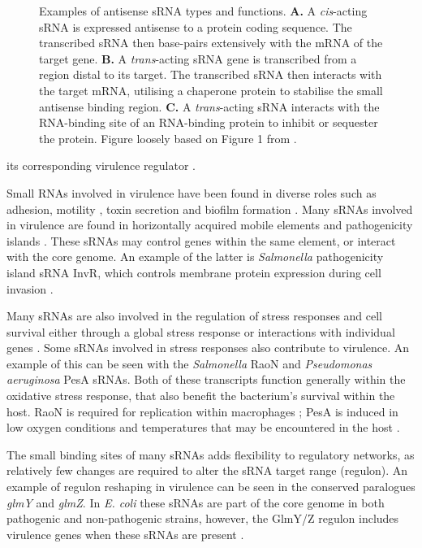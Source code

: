 \begin{figure}
  \centering
  \caption[Examples of antisense sRNA types and functions]{Examples of antisense sRNA types and functions. \textbf{A.} A \textit{cis}-acting sRNA is expressed antisense to a protein coding sequence. The transcribed sRNA then base-pairs extensively with the mRNA of the target gene. \textbf{B.} A \textit{trans}-acting sRNA gene is transcribed from a region distal to its target. The transcribed sRNA then interacts with the target mRNA, utilising a chaperone protein to stabilise the small antisense binding region. \textbf{C.} A \textit{trans}-acting sRNA interacts with the RNA-binding site of an RNA-binding protein to inhibit or sequester the protein. Figure loosely based on Figure 1 from \cite{Pernitzsch2012-xo}.}
  \label{fig:sRNA_cis_trans}
\end{figure} its corresponding virulence regulator \citep{Gong2011-vs}.\par
Small RNAs involved in virulence have been found in diverse roles such as adhesion, motility \citep{Vannini2016-mn}, toxin secretion and biofilm formation \citep{Bradley2011-rh}. Many sRNAs involved in virulence are found in horizontally acquired mobile elements and pathogenicity islands \citep{Papenfort2010-cj}.  
These sRNAs may control genes within the same element, or interact with the core genome. An example of the latter is \textit{Salmonella} pathogenicity island sRNA InvR, which controls membrane protein expression during cell invasion \citep{Pfeiffer2007-yb}. \par

Many sRNAs are also involved in the regulation of stress responses and cell survival either through a global stress response or interactions with individual genes \citep{Bhatt2016-dk,Hoe2013-kh}. Some sRNAs involved in stress responses also contribute to virulence. An example of this can be seen with the \textit{Salmonella} RaoN and \textit{Pseudomonas aeruginosa} PesA sRNAs. Both of these transcripts function generally within the oxidative stress response, that also benefit the bacterium’s survival within the host. RaoN is required for replication within macrophages  \citep{Lee2013-un}; PesA is induced in low oxygen conditions and temperatures that may be encountered in the host \citep{Ferrara2017-su}.\par

The small binding sites of many sRNAs adds flexibility to regulatory networks, as relatively few changes are required to alter the sRNA target range (regulon). An example of regulon reshaping in virulence can be seen in the conserved paralogues \textit{glmY} and \textit{glmZ}. In \textit{E. coli} these sRNAs are part of the core genome in both pathogenic and non-pathogenic strains, however, the GlmY/Z regulon includes virulence genes when these sRNAs are present \citep{Bhatt2016-dk,Gruber2015-rb}. \par

